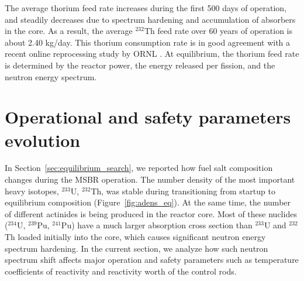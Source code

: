 The average thorium feed rate increases during the first 500 days of 
operation, and steadily decreases due to spectrum hardening and accumulation 
of absorbers in the core. As a result, the average $^{232}$Th feed rate over 
60 years of operation is about 2.40 kg/day. This thorium consumption rate is 
in good agreement with a recent online reprocessing study by \gls{ORNL} 
\cite{betzler_molten_2017}. At equilibrium, the thorium feed rate is 
determined by the reactor power, the energy released per fission, and the 
neutron energy spectrum.


\section{Operational and safety parameters evolution}
In Section~\ref{sec:equilibrium_search}, we reported how fuel salt composition 
changes during the \gls{MSBR} operation. The number density of the most 
important heavy isotopes, $^{233}$U, $^{232}$Th, was stable during 
transitioning from startup to equilibrium composition  
(Figure~\ref{fig:adens_eq}). At the same time, the number of different 
actinides is being produced in the reactor core. Most of these nuclides 
($^{234}$U, $^{239}$Pu, $^{241}$Pu) have a much larger absorption cross 
section than $^{233}$U and $^{232}$Th loaded initially into the core, which 
causes significant neutron energy spectrum hardening. In the current section, 
we analyze how such neutron spectrum shift affects major operation and safety 
parameters such as temperature coefficients of reactivity and reactivity worth 
of the control rods. 

